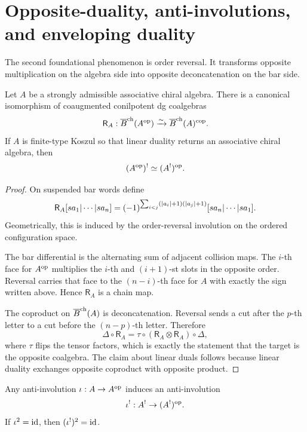 \section{Opposite-duality, anti-involutions, and enveloping duality}

The second foundational phenomenon is order reversal. It transforms opposite multiplication on the
algebra side into opposite deconcatenation on the bar side.

\begin{theorem}
Let $A$ be a strongly admissible associative chiral algebra. There is a canonical isomorphism of
coaugmented conilpotent dg coalgebras
\[
\mathsf{R}_A:\overline{B}^{\mathrm{ch}}(A^{\mathrm{op}})\xrightarrow{\sim}\overline{B}^{\mathrm{ch}}(A)^{\mathrm{cop}}.
\]
If $A$ is finite-type Koszul so that linear duality returns an associative chiral algebra, then
\[
(A^{\mathrm{op}})^!\simeq (A^!)^{\mathrm{op}}.
\]
\end{theorem}

\begin{proof}
On suspended bar words define
\[
\mathsf{R}_A[s a_1|\cdots|s a_n]
=
(-1)^{\sum_{i<j}(|a_i|+1)(|a_j|+1)}
[s a_n|\cdots|s a_1].
\]
Geometrically, this is induced by the order-reversal involution on the ordered configuration space.

The bar differential is the alternating sum of adjacent collision maps. The $i$-th face for
$A^{\mathrm{op}}$ multiplies the $i$-th and $(i+1)$-st slots in the opposite order. Reversal carries that
face to the $(n-i)$-th face for $A$ with exactly the sign written above. Hence $\mathsf{R}_A$ is a
chain map.

The coproduct on $\overline{B}^{\mathrm{ch}}(A)$ is deconcatenation. Reversal sends a cut after the $p$-th letter to a
cut before the $(n-p)$-th letter. Therefore
\[
\Delta\circ\mathsf{R}_A
=
\tau\circ(\mathsf{R}_A\otimes\mathsf{R}_A)\circ\Delta,
\]
where $\tau$ flips the tensor factors, which is exactly the statement that the target is the
opposite coalgebra. The claim about linear duals follows because linear duality exchanges opposite
coproduct with opposite product.
\end{proof}

\begin{corollary}
Any anti-involution $\iota:A\to A^{\mathrm{op}}$ induces an anti-involution
\[
\iota^!:A^!\to (A^!)^{\mathrm{op}}.
\]
If $\iota^2=\mathrm{id}$, then $(\iota^!)^2=\mathrm{id}$.
\end{corollary}

